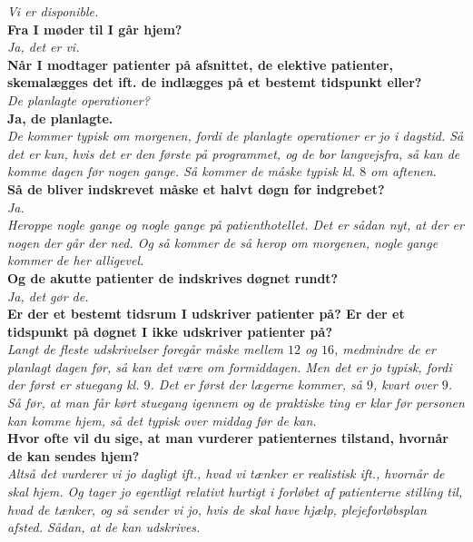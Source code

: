 \noindent
\textit{Vi er disponible.} \\
\noindent
\textbf{Fra I møder til I går hjem?} \\
\noindent
\textit{Ja, det er vi.}  \\
\noindent
\textbf{Når I modtager patienter på afsnittet, de elektive patienter, skemalægges det ift. de indlægges på et bestemt tidspunkt eller?}\\
\noindent
\textit{De planlagte operationer?} \\
\noindent
\textbf{Ja, de planlagte.} \\
\noindent
\textit{De kommer typisk om morgenen, fordi de planlagte operationer er jo i dagstid. Så det er kun, hvis det er den første på programmet, og de bor langvejsfra, så kan de komme dagen før nogen gange. Så kommer de måske typisk kl. $8$ om aftenen.} \\
\noindent
\textbf{Så de bliver indskrevet måske et halvt døgn før indgrebet?} \\
\noindent
\textit{Ja.} \\
\noindent
\textit{Heroppe nogle gange og nogle gange på patienthotellet. Det er sådan nyt, at der er nogen der går der ned. Og så kommer de så herop om morgenen, nogle gange kommer de her alligevel.} \\
\noindent
\textbf{Og de akutte patienter de indskrives døgnet rundt?} \\
\noindent
\textit{Ja, det gør de.} \\
\noindent
\textbf{Er der et bestemt tidsrum I udskriver patienter på? Er der et tidspunkt på døgnet I ikke udskriver patienter på?} \\
\noindent
\textit{Langt de fleste udskrivelser foregår måske mellem $12$ og $16$, medmindre de er planlagt dagen før, så kan det være om formiddagen. Men det er jo typisk, fordi der først er stuegang kl. $9$. Det er først der lægerne kommer, så $9$, kvart over $9$. Så før, at man får kørt stuegang igennem og de praktiske ting er klar før personen kan komme hjem, så det typisk over middag før de kan.} \\
\noindent
\textbf{Hvor ofte vil du sige, at man vurderer patienternes tilstand, hvornår de kan sendes hjem?}  \\
\noindent
\textit{Altså det vurderer vi jo dagligt ift., hvad vi tænker er realistisk ift., hvornår de skal hjem. Og tager jo egentligt relativt hurtigt i forløbet af patienterne stilling til, hvad de tænker, og så sender vi jo, hvis de skal have hjælp, plejeforløbsplan afsted. Sådan, at de kan udskrives.} \\
